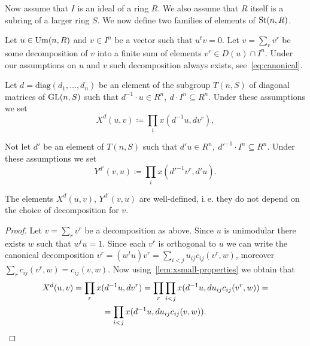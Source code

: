 Now assume that $I$ is an ideal of a ring $R$.
We also assume that $R$ itself is a subring of a larger ring $S$.
We now define two families of elements of $\operatorname{St}(n, R)$.
\begin{dfn} \label{dfn:xy-def}
    Let $u \in \operatorname{Um}(n, R)$ and $v \in I^n$ be a vector such that $u^{t}v = 0$.
    Let $v = \sum_r v^r$ be some decomposition of $v$ into a finite sum of elements $v^r \in D(u) \cap I^n$.
    Under our assumptions on $u$ and $v$ such decomposition always exists, see~\eqref{eq:canonical}.

    Let $d = \mathrm{diag}(d_1, \ldots, d_n)$ be an element of the subgroup $T(n, S)$ of diagonal matrices of $\operatorname{GL}(n, S)$ such that
    $d^{-1} \cdot u \in R^n,\ d \cdot I^n \subseteq R^n.$
    Under these assumptions we set
    \begin{equation} \label{eq:X-def}
        X^d(u, v) \coloneqq \prod_i x(d^{-1}u, dv^r),
    \end{equation}

    Not let $d'$ be an element of $T(n, S)$ such that $d' u\in R^n,\ {d'}^{-1} \cdot I^n \subseteq R^n$.
    Under these assumptions we set
    \begin{equation} \label{eq:Y-def}
        Y^{d'}(v, u) \coloneqq \prod_i x({d'}^{-1} v^r, {d'}u).
    \end{equation}
\end{dfn}

\begin{lemma}
    \label{lem:xy-wd}
    The elements $X^d(u, v)$, $Y^{d'}(v, u)$ are well-defined, i.\,e. they do not depend on the choice of decomposition for $v$.
\end{lemma}
\begin{proof}
    Let $v = \sum_r v^r$ be a decomposition as above.
    Since $u$ is unimodular there exists $w$ such that $w^t u = 1$.
    Since each $v^r$ is orthogonal to $u$ we can write the canonical decomposition
    $v^r = (w^tu)v^r = \sum_{i<j} u_{ij} c_{ij}(v^r, w)$, moreover $\sum_{r} c_{ij}(v^r, w) = c_{ij}(v, w)$.
    Now using~\cref{lem:xsmall-properties} we obtain that
    \begin{multline*}
        X^d(u, v) =
        \prod\limits_r x(d^{-1}u, dv^r) = \prod\limits_{r}\prod\limits_{i<j} x(d^{-1} u, du_{ij}c_{ij}(v^r, w)) = \\ =
        \prod\limits_{i<j} x(d^{-1} u, d u_{ij}c_{ij}(v, w)). \qedhere
    \end{multline*}
\end{proof}

